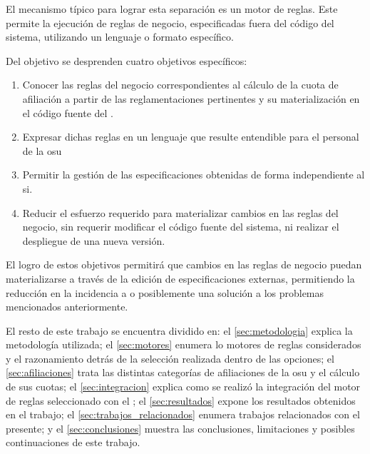 El mecanismo típico para lograr esta separación es un motor de reglas. 
Este permite la ejecución de reglas de negocio, especificadas fuera del código del sistema, utilizando un lenguaje o formato específico.


Del objetivo se desprenden cuatro objetivos específicos:
\begin{enumerate}
    \item \label{obj:esp:extraer}
    Conocer las reglas del negocio correspondientes al cálculo de la cuota de afiliación a partir de las reglamentaciones pertinentes y su materialización en el código fuente del {\SIDOSPU}.
    \item \label{obj:esp:intelegible}
    Expresar dichas reglas en un lenguaje que resulte entendible para el personal de la \acrlong{osu}
    \item \label{obj:esp:independiente}
    Permitir la gestión de las especificaciones obtenidas de forma independiente al \acrshort{si}.
    \item \label{obj:esp:esfuerzo}
    Reducir el esfuerzo requerido para materializar cambios en las reglas del negocio, sin requerir modificar el código fuente del sistema, ni realizar el despliegue de una nueva versión.
\end{enumerate}

El logro de estos objetivos permitirá que cambios en las reglas de negocio puedan materializarse a través de la edición de especificaciones externas,  permitiendo la reducción en la incidencia a o posiblemente una solución a los problemas mencionados anteriormente.


El resto de este trabajo se encuentra dividido en:
el \cref{sec:metodologia} explica la metodología utilizada; 
el \cref{sec:motores} enumera lo motores de reglas considerados y el razonamiento detrás de la selección realizada dentro de las opciones;
el \cref{sec:afiliaciones} trata las distintas categorías de afiliaciones de la \acrshort{osu} y el cálculo de sus cuotas;
el \cref{sec:integracion} explica como se realizó la integración del motor de reglas seleccionado con el {\SIOSU};
el \cref{sec:resultados} expone los resultados obtenidos en el trabajo;
el \cref{sec:trabajos_relacionados} enumera trabajos relacionados con el presente; y
el \cref{sec:conclusiones} muestra las conclusiones, limitaciones y posibles continuaciones de este trabajo.